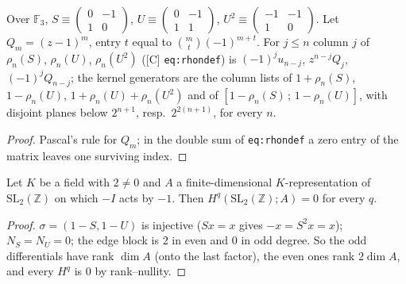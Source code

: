 \begin{theorem}[The two-plane columns are $\rho_n$ mod $3$ (F1 at $\ell=3$)]\label{thm:lv3-f1}
  \leanok
  Over $\mathbb F_3$, $S\equiv\left(\begin{smallmatrix}0&-1\\1&0\end{smallmatrix}\right)$, $U\equiv\left(\begin{smallmatrix}0&-1\\1&1\end{smallmatrix}\right)$,
  $U^2\equiv\left(\begin{smallmatrix}-1&-1\\1&0\end{smallmatrix}\right)$.  Let $Q_m=(z-1)^m$, entry $t$ equal to $\binom mt(-1)^{m+t}$.  For $j\le n$
  column $j$ of $\rho_n(S)$, $\rho_n(U)$, $\rho_n(U^2)$ ([C] \texttt{eq:rhondef}) is $(-1)^ju_{n-j}$, $z^{n-j}Q_j$, $(-1)^jQ_{n-j}$; the
  kernel generators are the column lists of $1+\rho_n(S)$, $1-\rho_n(U)$, $1+\rho_n(U)+\rho_n(U^2)$ and of
  $[1-\rho_n(S)\,;\,1-\rho_n(U)]$, with disjoint planes below $2^{n+1}$, resp.\ $2^{2(n+1)}$, for every $n$.
\end{theorem}
\begin{proof}
  \leanok
  Pascal's rule for $Q_m$; in the double sum of \texttt{eq:rhondef} a zero entry of the matrix leaves one surviving index.
\end{proof}

\begin{theorem}\label{thm:lv3-tree-negone}
  \leanok
  Let $K$ be a field with $2\ne0$ and $A$ a finite-dimensional $K$-representation of $\mathrm{SL}_2(\mathbb Z)$ on which $-I$ acts by
  $-1$.  Then $H^q(\mathrm{SL}_2(\mathbb Z);A)=0$ for every $q$.
\end{theorem}
\begin{proof}
  \leanok
  $\sigma=(1-S,1-U)$ is injective ($Sx=x$ gives $-x=S^2x=x$); $N_S=N_U=0$; the edge block is $2$ in even and $0$ in odd degree.  So
  the odd differentials have rank $\dim A$ (onto the last factor), the even ones rank $2\dim A$, and every $H^q$ is $0$ by rank--nullity.
\end{proof}

